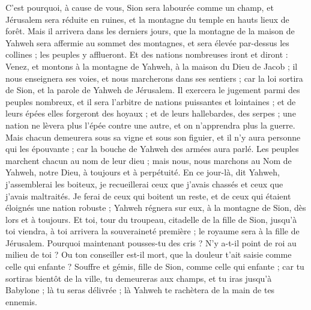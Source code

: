 \begin{multicols}{2}
C'est pourquoi, à cause de vous, Sion sera labourée comme un champ, et Jérusalem sera réduite en ruines, et la montagne du temple en hauts lieux de forêt.
\VerseOne{}Mais il arrivera dans les derniers jours, que  la montagne de la maison de Yahweh sera affermie au sommet des montagnes, et sera élevée par-dessus les collines ; les peuples y afflueront.
Et des nations nombreuses iront et diront : Venez, et montons à la montagne de Yahweh, à la maison du Dieu de Jacob ; il nous enseignera ses voies, et nous marcherons dans ses sentiers ; car la loi sortira de Sion, et la parole de Yahweh de Jérusalem.
Il exercera le jugement parmi des peuples nombreux, et il sera l'arbitre de nations puissantes et lointaines ; et de leurs épées elles forgeront des hoyaux ; et de leurs hallebardes, des serpes ; une nation ne lèvera plus l'épée contre une autre, et on n'apprendra plus la guerre.
Mais chacun demeurera sous sa vigne et sous son figuier, et il n'y aura personne qui les épouvante ; car la bouche de Yahweh des armées aura parlé.
Les peuples marchent chacun au nom de leur dieu ; mais nous, nous marchons au Nom de Yahweh, notre Dieu, à toujours et à perpétuité.
En ce jour-là, dit Yahweh, j'assemblerai les boiteux, je recueillerai ceux que j'avais chassés et ceux que j'avais maltraités.
Je ferai de ceux qui boitent un reste, et de ceux qui étaient éloignés une nation robuste ; Yahweh régnera sur eux, à la montagne de Sion, dès lors et à toujours.
Et toi, tour du troupeau, citadelle de la fille de Sion, jusqu'à toi viendra, à toi arrivera la souveraineté première ; le royaume sera à la fille de Jérusalem.
Pourquoi maintenant pousses-tu des cris ? N'y a-t-il point de roi au milieu de toi ? Ou ton conseiller est-il mort, que la douleur t'ait saisie comme celle qui enfante ?
Souffre et gémis, fille de Sion, comme celle qui enfante ; car tu sortiras bientôt de la ville, tu demeureras aux champs, et tu iras jusqu'à Babylone ; là tu seras délivrée ; là Yahweh te rachètera de la main de tes ennemis.

\end{multicols}
